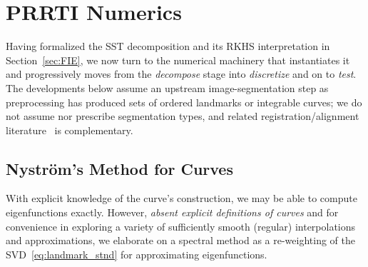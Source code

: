\documentclass[pdflatex,iicol]{sn-jnl}%
\theoremstyle{thmstyleone}%
\theoremstyle{thmstyletwo}%
\theoremstyle{thmstylethree}%
\begin{document}

\section{PRRTI Numerics}\label{sec:numerics}
Having formalized the SST decomposition and its RKHS interpretation in Section~\ref{sec:FIE}, we now turn to the numerical machinery that instantiates it and progressively moves from the \emph{decompose} stage into \emph{discretize} and on to \emph{test}. The developments below assume an upstream image-segmentation step as preprocessing has produced sets of ordered landmarks or integrable curves; we do not assume nor prescribe segmentation types, and related registration/alignment literature~\cite{dogan2015fast, al2013continuous, rangarajan1997softassign, srivastava2016functional} is complementary.

%

\subsection{Nystr{\"o}m's Method for Curves}\label{subsec:Nystrom}
With explicit knowledge of the curve's construction, we may be able to compute eigenfunctions exactly. However, \emph{absent explicit definitions of curves} and for convenience in exploring a variety of sufficiently smooth (regular) interpolations and approximations, we elaborate on a spectral method as a re-weighting of the SVD~\eqref{eq:landmark_stnd} for approximating eigenfunctions.
\end{document}
